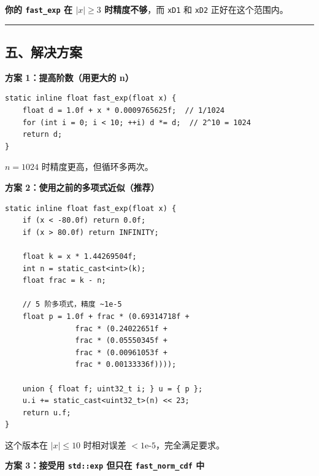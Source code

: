 \documentclass[11pt, a4paper]{article}
\begin{document}
\begin{aibox}
\textbf{你的 \texttt{fast\_exp} 在 $|x| \ge 3$ 时精度不够}，而 \texttt{xD1} 和 \texttt{xD2} 正好在这个范围内。

\begin{center}\rule{\textwidth}{0.4pt}\end{center}

\subsection*{五、解决方案}

\textbf{方案 1：提高阶数（用更大的 n）}

\begin{tcolorbox}[colback=white,colframe=gray!50!white,boxrule=0.5pt,arc=2pt,left=5pt,right=5pt,top=5pt,bottom=5pt]
\begin{verbatim}
static inline float fast_exp(float x) {
    float d = 1.0f + x * 0.0009765625f;  // 1/1024
    for (int i = 0; i < 10; ++i) d *= d;  // 2^10 = 1024
    return d;
}
\end{verbatim}
\end{tcolorbox}
$n=1024$ 时精度更高，但循环多两次。

\vspace{1em}
\textbf{方案 2：使用之前的多项式近似（推荐）}

\begin{tcolorbox}[colback=white,colframe=gray!50!white,boxrule=0.5pt,arc=2pt,left=5pt,right=5pt,top=5pt,bottom=5pt]
\begin{verbatim}
static inline float fast_exp(float x) {
    if (x < -80.0f) return 0.0f;
    if (x > 80.0f) return INFINITY;
    
    float k = x * 1.44269504f;
    int n = static_cast<int>(k);
    float frac = k - n;
    
    // 5 阶多项式，精度 ~1e-5
    float p = 1.0f + frac * (0.69314718f + 
                frac * (0.24022651f + 
                frac * (0.05550345f + 
                frac * (0.00961053f + 
                frac * 0.00133336f))));
    
    union { float f; uint32_t i; } u = { p };
    u.i += static_cast<uint32_t>(n) << 23;
    return u.f;
}
\end{verbatim}
\end{tcolorbox}
这个版本在 $|x| \le 10$ 时相对误差 $< 1\text{e-}5$，完全满足要求。

\vspace{1em}
\textbf{方案 3：接受用 \texttt{std::exp} 但只在 \texttt{fast\_norm\_cdf} 中}


\end{aibox}
\end{document}
